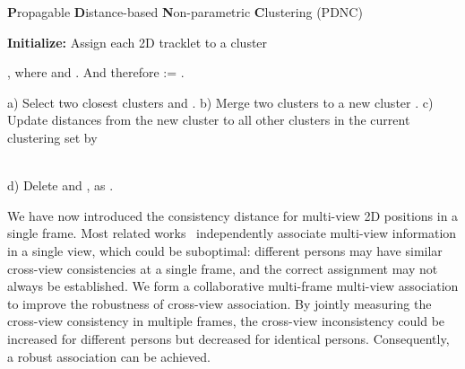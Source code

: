 \documentclass{CVM}
\begin{document}
\begin{algorithm*}[h!]
  \caption{\textbf{P}ropagable \textbf{D}istance-based \textbf{N}on-parametric \textbf{C}lustering (PDNC)}
  \label{alg:PDNC}
  \begin{algorithmic}[1]
  \begin{small}

  \State \textbf{Initialize:} Assign each 2D tracklet to a cluster \strut, where  and . And therefore  := .
    
  
  \State a) Select two closest clusters  and .
  \State b) Merge two clusters to a new cluster . 
  \State c) Update distances from the new cluster  to all other clusters in the current clustering set  by

   \State \textcolor{mygray}{\sout{ } } \Comment{\textcolor{mygray}{Conventional Complete-linkage Clustering approach}} \\
  
    
    \Comment{\textcolor{mypink1}{Our proposal}} 
 \EndFor
 \State d) Delete  and , as .

  \EndWhile
\end{small}
\end{algorithmic}
\end{algorithm*}


 

We have now introduced the consistency distance for multi-view 2D positions in a single frame. Most related works~\cite{chen2020multi,chen2020cross,dong2021fast,zhang2022voxeltrack} independently associate multi-view information in a single view, which could be suboptimal: different persons may have similar cross-view consistencies at a single frame, and the correct assignment may not always be established. We form a collaborative multi-frame multi-view association to improve the robustness of cross-view association. By jointly measuring the cross-view consistency in multiple frames, the cross-view inconsistency could be increased for different persons but decreased for identical persons. Consequently, a robust association can be achieved.
\end{document}
